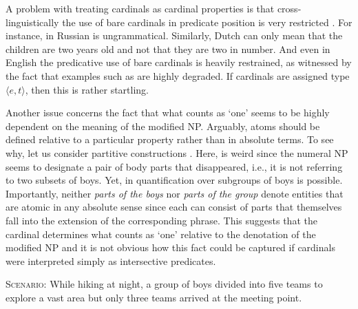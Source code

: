 \documentclass[output=paper]{langscibook}
\begin{document}
A problem with treating cardinals as cardinal properties is that cross-linguistically the use of bare cardinals in predicate position is very restricted \citep[33--34]{ionin_matushansky2018cardinals}. For instance, in Russian  is ungrammatical. Similarly, Dutch  can only mean that the children are two years old and not that they are two in number. And even in English the predicative use of bare cardinals is heavily restrained, as witnessed by the fact that examples such as  are highly degraded. If cardinals are assigned type $\langle e,t\rangle$, then this is rather startling. 

		\label{ex:russian-predicate}
	\z    

	\label{ex:dutch-predicate}
	\z

    \label{ex:english-predicate}
    \z

\noindent Another issue concerns the fact that what counts as `one' seems to be highly dependent on the meaning of the modified NP. Arguably, atoms should be defined relative to a particular property rather than in absolute terms. To see why, let us consider partitive constructions  \citep[see][]{chierchia2010mass,wagiel2018subatomic}. Here,  is weird since the numeral NP seems to designate a pair of body parts that disappeared, i.e., it is not referring to two subsets of boys. Yet, in  quantification over subgroups of boys is possible. Importantly, neither \textit{parts of the boys} nor \textit{parts of the group} denote entities that are atomic in any absolute sense since each can consist of parts that themselves fall into the extension of the corresponding phrase. This suggests that the cardinal determines what counts as `one' relative to the denotation of the modified NP and it is not obvious how this fact could be captured if cardinals were interpreted simply as intersective predicates.

\ea\label{ex:partitives} \textsc{Scenario:} While hiking at night, a group of boys divided into five teams to explore a vast area but only three teams arrived at the meeting point.
\label{ex:partitives-plural}  
\label{ex:partitives-group} 
\z
\z
\end{document}
